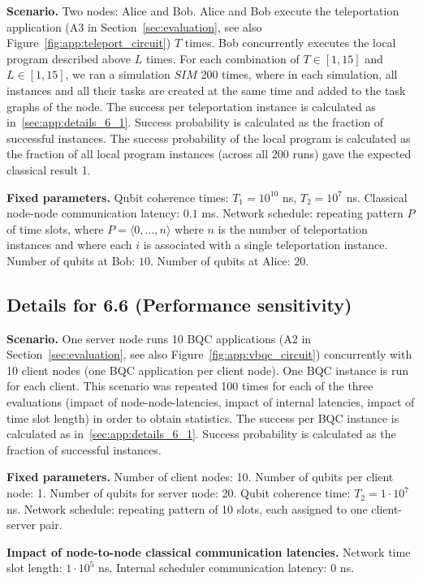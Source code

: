 \textbf{Scenario.}
Two nodes: Alice and Bob.
Alice and Bob execute the teleportation application (A3 in Section~\ref{sec:evaluation}, see also Figure~\ref{fig:app:teleport_circuit}) $T$ times.
Bob concurrently executes the local program described above $L$ times.
For each combination of $T \in [1, 15]$ and $L \in [1, 15]$, we ran a simulation $SIM$ 200 times, where in each simulation, all instances and all their tasks are created at the same time and added to the task graphs of the node.
The success per teleportation instance is calculated as in~\ref{sec:app:details_6_1}.
Success probability is calculated as the fraction of successful instances.
The success probability of the local program is calculated as the fraction of all local program instances (across all 200 runs) gave the expected classical result 1.

\textbf{Fixed parameters.}
Qubit coherence times: $T_1 = 10^{10}$ ns, $T_2 = 10^7$ ns.
Classical node-node communication latency: $0.1$ ms.
Network schedule: repeating pattern $P$ of time slots, where $P = \langle 0, \dots, n \rangle$ where $n$ is the number of teleportation instances and where each $i$ is associated with a single teleportation instance.
Number of qubits at Bob: $10$.
Number of qubits at Alice: $20$.


\subsection{Details for 6.6 (Performance sensitivity)}
\textbf{Scenario.}
One server node runs 10 BQC applications (A2 in Section~\ref{sec:evaluation}, see also Figure~\ref{fig:app:vbqc_circuit}) concurrently with 10 client nodes (one BQC application per client node).
One BQC instance is run for each client.
This scenario was repeated 100 times for each of the three evaluations (impact of node-node-latencies, impact of internal latencies, impact of time slot length) in order to obtain statistics.
The success per BQC instance is calculated as in~\ref{sec:app:details_6_1}.
Success probability is calculated as the fraction of successful instances.

\textbf{Fixed parameters.}
Number of client nodes: 10.
Number of qubits per client node: 1.
Number of qubits for server node: 20.
Qubit coherence time: $T_2 = 1\cdot 10^7$ ns.
Network schedule: repeating pattern of 10 slots, each assigned to one client-server pair.

\textbf{Impact of node-to-node classical communication latencies.}
Network time slot length: $1\cdot 10^5$ ns.
Internal scheduler communication latency: $0$ ns.

